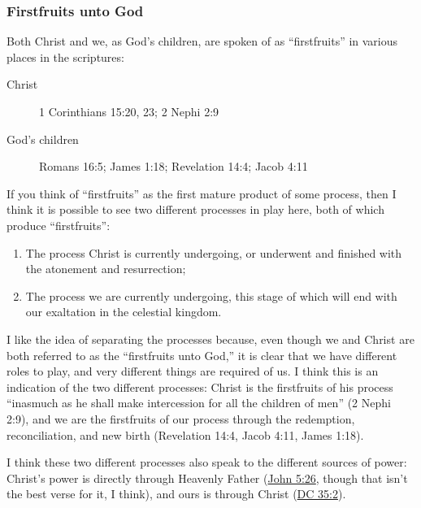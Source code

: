 	
		
	\subsubsection{Firstfruits unto God}
		\label{FIRSTFRUITS-UNTOGOD}
	
		Both Christ and we, as God's children, are spoken of as ``firstfruits'' in various places in the scriptures:
		
		\begin{description}
			\item[Christ] 1 Corinthians 15:20, 23; 2 Nephi 2:9
			\item[God's children] Romans 16:5; James 1:18; Revelation 14:4; Jacob 4:11
		\end{description}
		
		If you think of ``firstfruits'' as the first mature product of some process, then I think it is possible to see two different processes in play here, both of which produce ``firstfruits'':
		
		\begin{enumerate}
			\item The process Christ is currently undergoing, or underwent and finished with the atonement and resurrection;
			\item The process we are currently undergoing, this stage of which will end with our exaltation in the celestial kingdom.
		\end{enumerate}
		
		I like the idea of separating the processes because, even though we and Christ are both referred to as the ``firstfruits unto God,'' it is clear that we have different roles to play, and very different things are required of us. I think this is an indication of the two different processes: Christ is the firstfruits of his process ``inasmuch as he shall make intercession for all the children of men'' (2 Nephi 2:9), and we are the firstfruits of our process through the redemption, reconciliation, and new birth (Revelation 14:4, Jacob 4:11, James 1:18).
		
		I think these two different processes also speak to the different sources of power: Christ's power is directly through Heavenly Father (\hyperref[JOHN-5-26]{John 5:26}, though that isn't the best verse for it, I think), and ours is through Christ (\hyperref[DC35-2]{DC 35:2}).